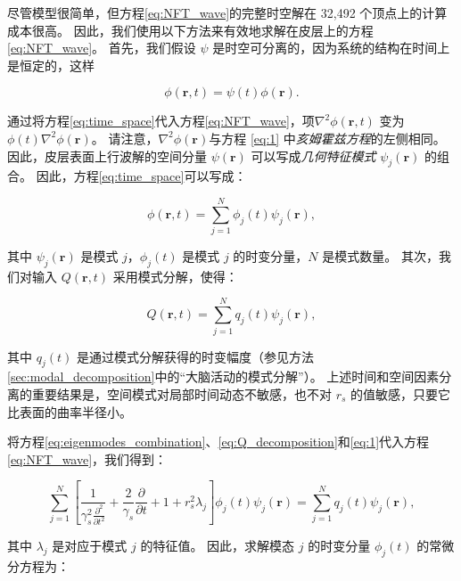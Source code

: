 \documentclass[lang=cn,a4paper,newtx]{elegantpaper}
\begin{document}
尽管模型很简单，但方程\ref{eq:NFT_wave}的完整时空解在 32,492 个顶点上的计算成本很高。
因此，我们使用以下方法来有效地求解在皮层上的方程\ref{eq:NFT_wave}。
首先，我们假设 $ \psi $ 是时空可分离的，因为系统的结构在时间上是恒定的，这样

\begin{equation}\label{eq:time_space}
	\phi(\boldsymbol{r}, t) = 
		\psi(t) \phi(\boldsymbol{r}).
\end{equation}

通过将方程\ref{eq:time_space}代入方程\ref{eq:NFT_wave}，项$ \nabla^2 \phi(\boldsymbol{r}, t) $ 变为 $ \phi(t) \nabla^2 \phi
(\boldsymbol{r}) $。
请注意，$ \nabla^2 \phi(\boldsymbol{r}) $与方程 \ref{eq:1} 中\textit{亥姆霍兹方程}的左侧相同。
因此，皮层表面上行波解的空间分量 $ \psi(\boldsymbol{r}) $ 可以写成\textit{几何特征模式} $ \psi_j(\boldsymbol{r}) $ 的组合。
因此，方程\ref{eq:time_space}可以写成：

\begin{equation}\label{eq:eigenmodes_combination}
	\phi(\boldsymbol{r}, t) = 
		\sum_{j=1}^{N}
			\phi_j(t) \psi_j(\boldsymbol{r}),
\end{equation}

其中 $ \psi_j(\boldsymbol{r}) $ 是模式 $ j $，$ \phi_j(t) $ 是模式 $ j $ 的时变分量，$ N $ 是模式数量。
其次，我们对输入 $ Q(\boldsymbol{r},t) $ 采用模式分解，使得：

\begin{equation}\label{eq:Q_decomposition}
	Q(\boldsymbol{r}, t) = 
		\sum_{j=1}^{N}
			q_j(t) \psi_j(\boldsymbol{r}),
\end{equation}


其中 $ q_j (t) $ 是通过模式分解获得的时变幅度（参见方法\ref{sec:modal_decomposition}中的“大脑活动的模式分解”）。
上述时间和空间因素分离的重要结果是，空间模式对局部时间动态不敏感，也不对 $ r_s $ 的值敏感，只要它比表面的曲率半径小。


将方程\ref{eq:eigenmodes_combination}、\ref{eq:Q_decomposition}和\ref{eq:1}代入方程\ref{eq:NFT_wave}，我们得到：

\begin{equation}\label{eq:NFT_expand}
	\sum_{j=1}^{N}
		[
		\frac{1}{\gamma _s^2 \frac{\partial^2}{\partial t^2}} +
		\frac{2}{\gamma _s} \frac{\partial}{\partial t} +
		1 + r_s^2 \lambda_j
		]
		\phi_j(t)
		\psi_j(\boldsymbol{r})
	=
		\sum_{j=1}^{N}
			q_j(t)
			\psi_j(\boldsymbol{r}),
\end{equation}

其中 $ λ_j $ 是对应于模式 $ j $ 的特征值。
因此，求解模态 $ j $ 的时变分量 $ \phi_j (t) $ 的常微分方程为：
\end{document}
